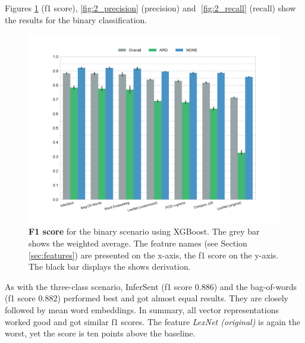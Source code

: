 \FloatBarrier

Figures \ref{fig:2_f1} (f1 score), \ref{fig:2_precision} (precision) and \ref{fig:2_recall} (recall) show the results for the binary classification.
\begin{figure}[htbp]
      \caption{\textbf{F1 score} for the binary scenario using XGBoost. The grey bar shows the weighted average. The feature names (see Section \ref{sec:features}) are presented on the x-axis, the f1 score on the y-axis. The black bar displays the shows derivation.} 
 
    \label{fig:2_f1}
 \centering
	\includegraphics[width=1\textwidth]{images/experiments/f1-True}

\end{figure}
As with the three-class scenario, InferSent (f1 score 0.886) and the bag-of-words (f1 score 0.882) performed best and got almost equal results. They are closely followed by mean word embeddings. In summary, all vector representations worked good and got similar f1 scores. The feature \emph{LexNet (original)} is again the worst, yet the score is ten points above the baseline.%






